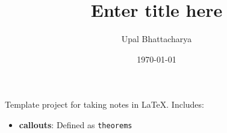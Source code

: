 \documentclass[a4paper,colorinlistoftodos]{article}
\author{Upal Bhattacharya}
\date{\today}
\title{Enter title here}
\begin{document}
\maketitle

\listoftodos

\linenumbers

Template project for taking notes in \LaTeX.
Includes:
\begin{itemize}
\item \textbf{callouts}: Defined as \verb|theorems|
\end{itemize}
\end{document}
